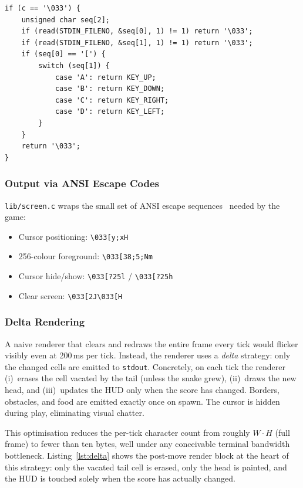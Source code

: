 \documentclass[conference]{IEEEtran}
\begin{document}
\begin{lstlisting}[caption={Non-blocking ANSI arrow-key decoder.},label={lst:keydecode}]
if (c == '\033') {
    unsigned char seq[2];
    if (read(STDIN_FILENO, &seq[0], 1) != 1) return '\033';
    if (read(STDIN_FILENO, &seq[1], 1) != 1) return '\033';
    if (seq[0] == '[') {
        switch (seq[1]) {
            case 'A': return KEY_UP;
            case 'B': return KEY_DOWN;
            case 'C': return KEY_RIGHT;
            case 'D': return KEY_LEFT;
        }
    }
    return '\033';
}
\end{lstlisting}

\subsubsection{Output via ANSI Escape Codes}
\texttt{lib/screen.c} wraps the small set of ANSI escape sequences~\cite{ansi} needed by the game:
\begin{itemize}
    \item Cursor positioning: \texttt{\textbackslash 033[y;xH}
    \item 256-colour foreground: \texttt{\textbackslash 033[38;5;Nm}
    \item Cursor hide/show: \texttt{\textbackslash 033[?25l} / \texttt{\textbackslash 033[?25h}
    \item Clear screen: \texttt{\textbackslash 033[2J\textbackslash 033[H}
\end{itemize}

\subsubsection{Delta Rendering}
A naive renderer that clears and redraws the entire frame every tick would flicker visibly even at 200\,ms per tick. Instead, the renderer uses a \textit{delta} strategy: only the changed cells are emitted to \texttt{stdout}. Concretely, on each tick the renderer (i)~erases the cell vacated by the tail (unless the snake grew), (ii)~draws the new head, and (iii)~updates the HUD only when the score has changed. Borders, obstacles, and food are emitted exactly once on spawn. The cursor is hidden during play, eliminating visual chatter.

This optimisation reduces the per-tick character count from roughly $W \cdot H$ (full frame) to fewer than ten bytes, well under any conceivable terminal bandwidth bottleneck. Listing~\ref{lst:delta} shows the post-move render block at the heart of this strategy: only the vacated tail cell is erased, only the head is painted, and the HUD is touched solely when the score has actually changed.
\end{document}
